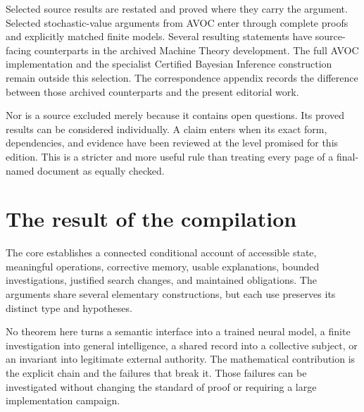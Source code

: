 Selected source results are restated and proved where they carry the argument. Selected stochastic-value arguments from AVOC enter through complete proofs and explicitly matched finite models. Several resulting statements have source-facing counterparts in the archived Machine Theory development. The full AVOC implementation and the specialist Certified Bayesian Inference construction remain outside this selection. The correspondence appendix records the difference between those archived counterparts and the present editorial work.

Nor is a source excluded merely because it contains open questions. Its proved results can be considered individually. A claim enters when its exact form, dependencies, and evidence have been reviewed at the level promised for this edition. This is a stricter and more useful rule than treating every page of a final-named document as equally checked.

\section{The result of the compilation}
The core establishes a connected conditional account of accessible state, meaningful operations, corrective memory, usable explanations, bounded investigations, justified search changes, and maintained obligations. The arguments share several elementary constructions, but each use preserves its distinct type and hypotheses.

No theorem here turns a semantic interface into a trained neural model, a finite investigation into general intelligence, a shared record into a collective subject, or an invariant into legitimate external authority. The mathematical contribution is the explicit chain and the failures that break it. Those failures can be investigated without changing the standard of proof or requiring a large implementation campaign.

